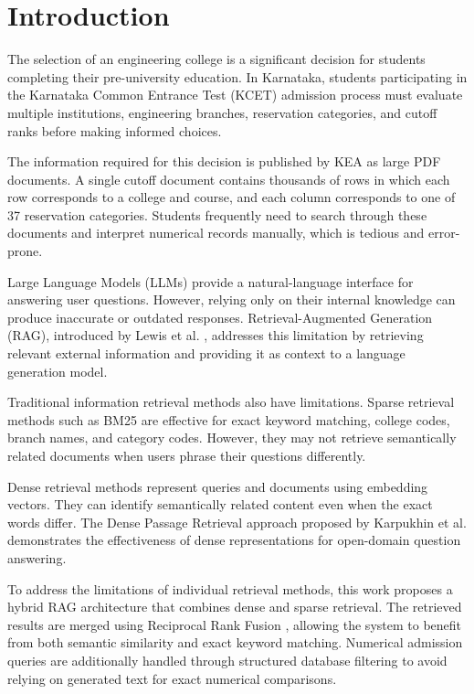 \documentclass[conference]{IEEEtran}
\begin{document}
\section{Introduction}

The selection of an engineering college is a significant
decision for students completing their pre-university
education. In Karnataka, students participating in the
Karnataka Common Entrance Test (KCET) admission process
must evaluate multiple institutions, engineering branches,
reservation categories, and cutoff ranks before
making informed choices.

The information required for this decision is published
by KEA as large PDF documents. A single cutoff document
contains thousands of rows in which each row corresponds
to a college and course, and each column corresponds to one
of 37 reservation categories. Students frequently need to
search through these documents and interpret numerical
records manually, which is tedious and error-prone.

Large Language Models (LLMs) provide a natural-language
interface for answering user questions. However, relying
only on their internal knowledge can produce inaccurate
or outdated responses. Retrieval-Augmented Generation
(RAG), introduced by Lewis et al. \cite{Lewis2020},
addresses this limitation by retrieving relevant external
information and providing it as context to a language
generation model.

Traditional information retrieval methods also have
limitations. Sparse retrieval methods such as BM25
\cite{Robertson2009} are effective for exact keyword
matching, college codes, branch names, and category
codes. However, they may not retrieve semantically
related documents when users phrase their questions
differently.

Dense retrieval methods represent queries and documents
using embedding vectors. They can identify semantically
related content even when the exact words differ.
The Dense Passage Retrieval approach proposed by
Karpukhin et al. \cite{Karpukhin2020} demonstrates
the effectiveness of dense representations for
open-domain question answering.

To address the limitations of individual retrieval
methods, this work proposes a hybrid RAG architecture
that combines dense and sparse retrieval. The retrieved
results are merged using Reciprocal Rank Fusion
\cite{Cormack2009}, allowing the system to benefit
from both semantic similarity and exact keyword matching.
Numerical admission queries are additionally handled through
structured database filtering to avoid relying on generated
text for exact numerical comparisons.
\end{document}
